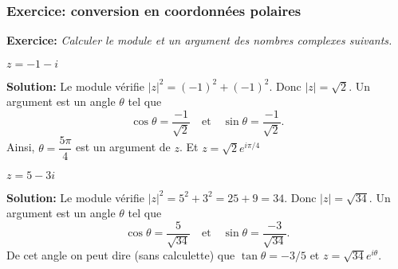 \begin{frame}
\frametitle{\bf Exercice: conversion en coordonnées polaires} 
\medskip 

{\bf Exercice:}
{\it Calculer le module et un argument des nombres complexes suivants.}
\vspace*{1mm}

\begin{itemize}
\bitem 
$z=-1-i$
\end{itemize}
\vspace*{2mm}

\pause
{\bf Solution:}
Le module vérifie $\left|z\right|^2= {(-1)^2+(-1)^2}$. Donc $\vert z\vert=\sqrt{2}$.
Un argument est un angle $\theta$ tel que 
$$
\cos{\theta}=\dfrac{-1}{\sqrt{2}} \quad\mbox{et}\quad 
\sin{\theta}=\dfrac{-1}{\sqrt{2}}. 
$$
Ainsi, $\theta = \dfrac{5\pi}{4}$ est un argument de $z$. Et $z=\sqrt 2e^{i\pi/4}$
\vspace*{3mm}

\pause
\begin{itemize}
\bitem 
$z=5-3i$
\end{itemize}
\vspace*{2mm}

\pause
{\bf Solution:}
Le module vérifie\quad 
$\left|z\right|^2= {5^2+3^2}={25+9}={34}$. Donc $\vert z\vert=\sqrt{34}$.
Un argument est un angle $\theta$ tel que 
$$
\cos{\theta}=\dfrac{5}{\sqrt{34}} \quad\mbox{et}\quad 
\sin{\theta}=\dfrac{-3}{\sqrt{34}}. 
$$
De cet angle on peut dire (sans calculette) que  $\tan\theta=-3/5$ et  $z=\sqrt{34}e^{i\theta}$.

\end{frame}


